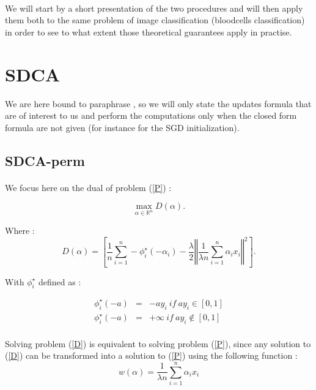 \documentclass[10pt,a4paper]{article}
\begin{document}
\paragraph{}
We will start by a short presentation of the two procedures and will then apply them both to the same problem of image classification (bloodcells classification) in order to see to what extent those theoretical guarantees apply in practise.

\section{SDCA}

We are here bound to paraphrase \cite{1}, so we will only state the updates formula that are of interest to us and perform the computations only when the closed form formula are not given (for instance for the SGD initialization).

\subsection{SDCA-perm}

\paragraph{}
We focus here on the dual of problem (\ref{P}) : 

\begin{equation}\label{D}
\max_{\alpha \in \mathbb{R}^n} D(\alpha).
\end{equation}

Where : 
$$D(\alpha) = \left [ \frac{1}{n} \sum_{i=1}^n - \phi_i^{\star} (-\alpha_i) - \frac{\lambda}{2} \left \Vert \frac{1}{\lambda n} \sum_{i=1}^n \alpha_i x_i\right \Vert ^2 \right ].$$

With $ \phi_i^{\star}$ defined as : 

\begin{eqnarray*}
\phi_i^{\star} (-a) &=& -ay_i ~if~ ay_i \in [0, 1]\\
\phi_i^{\star} (-a) &=& + \infty ~if~ ay_i \notin [0, 1]
\end{eqnarray*}

\paragraph{}
Solving problem (\ref{D}) is equivalent to solving problem (\ref{P}), since any solution to (\ref{D}) can be transformed into a solution to (\ref{P}) using the following function \cite{1} : 
$$ w(\alpha) = \frac{1}{\lambda n} \sum_{i=1}^n \alpha_i x_i$$
\end{document}
